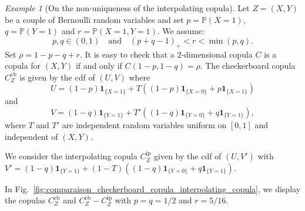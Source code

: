 \documentclass[12pt]{article}
\renewcommand{\P}{{\mathbb P}}
\newcommand{\ind}{\mathbf{1}}
\newcommand{\Cb}{C^\mathrm{cb}}
\newcommand{\Cip}{C^\mathrm{ip}}
\theoremstyle{plain}
\theoremstyle{remark}
\newtheorem{exple}{Example}
\begin{document}
\begin{exple}[On the non-uniqueness of the interpolating copula]
  \label{exple:unique-cop-rep}
    Let  $Z=(X,Y)$  be  a  couple  of Bernoulli  random  variables  and
    set $p=\P(X=1)$,  $q=\P(Y=1)  $ and  $r=\P(X=1,Y=1) $. We
    assume:
    \begin{equation}
        \label{eq:pqr}
        p,q\in (0,1) 
        \quad\text{and}\quad
        (p+q-1)_+ < r <
    \min(p,q). 
    \end{equation} 
    Set $\rho=1-p-q+r$. 
    It is easy to check that a $2$-dimensional copula $C$
    is a  copula for $(X,Y)$ if and only if $C(1-p, 1-q) = \rho$.
    The checkerboard copula $\Cb_Z$ 
is given by the cdf of  $(U,V)$
where 
$$
U= (1-p) \ind_{\{X=1\}} + T ( (1-p) \ind_{\{X=0\}} + p \ind_{\{X=1\}} ) 
$$
    and 
    $$
    V=  (1-q) \ind_{\{Y=1\}} + T' ( (1-q) \ind_{\{Y=0\}} + q
    \ind_{\{Y=1\}} ) ,
    $$ where $T$ and $T'$ are independent random variables uniform on
    $[0, 1]$ and independent of $(X,Y)$. 

    We consider the interpolating copula $\Cip_Z$  given by the cdf of $(U, V')$
    with  $V'=  (1-q) \ind_{\{Y=1\}} + (1-T) ( (1-q)
    \ind_{\{Y=0\}} + q \ind_{\{Y=1\}} ) $.

    In Fig.~\ref{fig:comparaison_checkerboard_copula_interpolating_copula}, we display the copulas $\Cb_Z$ and $\Cb_Z-\Cip_Z$ with $p =q=1/2$ and $r = 5/16$. 
 \end{exple}


\end{document}
